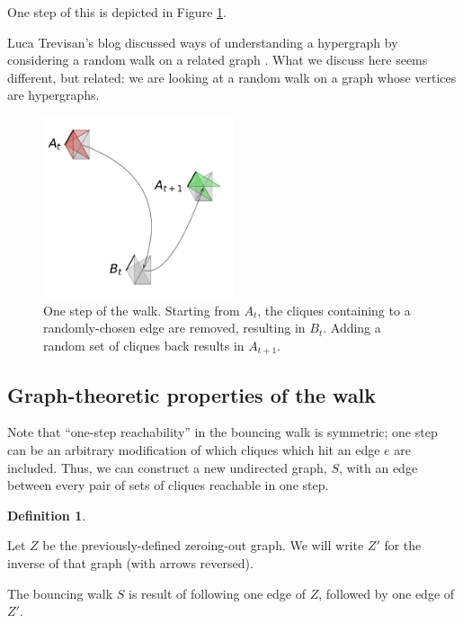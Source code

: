 \documentclass[12pt]{article}
\theoremstyle{definition}
\newtheorem{defn}{Definition}[section]
\begin{document}
One step of this is depicted in Figure \ref{fig:boing}.

Luca Trevisan's blog discussed ways of understanding a hypergraph by
considering a random walk on a related graph
\cite{luca_trevisan_blog_random_walks_1}.
What we discuss here seems different, but related:
we are looking at a random walk on a graph whose vertices are
hypergraphs.

\begin{figure}

\centering

\includegraphics[width=0.5\textwidth]{bounce.pdf}

\caption{
One step of the walk. Starting from $A_t$, the cliques containing 
to a randomly-chosen edge are removed, resulting in $B_t$.
Adding a random set of cliques back results in $A_{t+1}$.
}
\label{fig:boing}

\end{figure}

\subsection{Graph-theoretic properties of the walk}

Note that ``one-step reachability'' in the bouncing walk is symmetric;
one step can be an arbitrary modification of which cliques which hit
an edge $e$ are included.
Thus, we can construct a new undirected graph, $S$, with an edge between every
pair of sets of cliques reachable in one step.

\begin{defn} \label{def:bouncingWalk}

Let $Z$ be the previously-defined zeroing-out graph. We will write $Z'$ for
the inverse of that graph (with arrows reversed).

The bouncing walk $S$ is result of following one edge of $Z$, followed by one
edge of $Z'$.

\end{defn}
\end{document}
